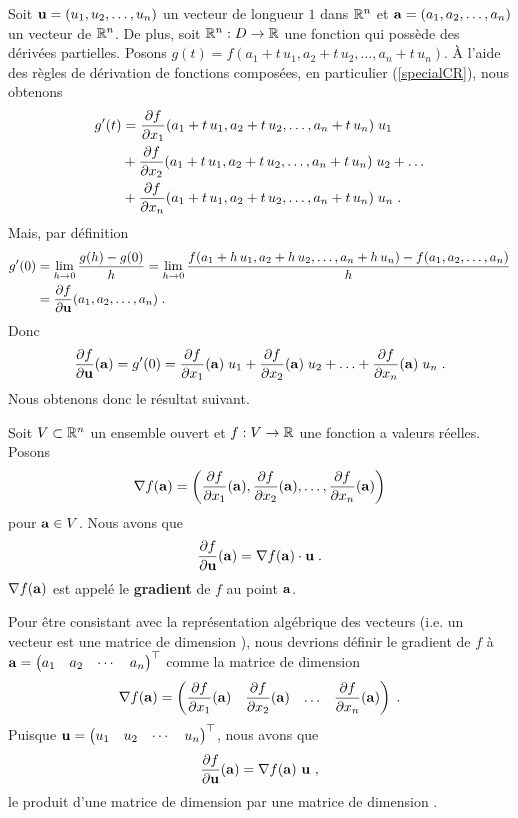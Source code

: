 {Soit $\mathbf{u} = (u_1,u_2, \ldots, u_n)$ un vecteur de longueur $1$ dans
$\mathbb{R}^n$ et $\mathbf{a}=(a_1,a_2,\ldots,a_n)$ un vecteur de $\mathbb{R}^n$. De plus,
soit $\mathbb{R}^n:D\rightarrow \mathbb{R}$ une fonction qui possède des dérivées
partielles.
Posons $g(t) = f(a_1+t\,u_1,a_2+t\,u_2, \ldots, a_n + t\, u_n)$. 
À l'aide des règles de dérivation de fonctions composées, en
particulier (\ref{specialCR}), nous obtenons
\begin{align*}
g'(t) &= \frac{\partial f}{\partial x_1}(a_1+t\,u_1,a_2+t\,u_2, \ldots, a_n + t\,u_n)\;u_1 \\
&+ \frac{\partial f}{\partial x_2}(a_1+t\,u_1,a_2+t\,u_2, \ldots, a_n + t\,u_n)\;u_2 + \ldots \\
&+ \frac{\partial f}{\partial x_n}(a_1+t\,u_1,a_2+t\,u_2, \ldots, a_n + t\,u_n)\;u_n \; .
\end{align*}
Mais, par définition
\begin{align*}
g'(0) &= \lim_{h\rightarrow 0} \frac{g(h)-g(0)}{h}
= \lim_{h\rightarrow 0}
\frac{f(a_1+h\,u_1,a_2+h\,u_2, \ldots, a_n + h\, u_n)
- f(a_1,a_2, \ldots, a_n)}{h} \\
&= \frac{\partial f}{\partial \mathbf{u}}(a_1,a_2, \ldots, a_n) \; .
\end{align*}
Donc
\[
\frac{\partial f}{\partial \mathbf{u}}(\mathbf{a}) = g'(0)
= \frac{\partial f}{\partial x_1}(\mathbf{a})\;u_1 +
\frac{\partial f}{\partial x_2}(\mathbf{a})\;u_2 +
\ldots + \frac{\partial f}{\partial x_n}(\mathbf{a})\;u_n \; .
\]
Nous obtenons donc le résultat suivant.

\begin{focus}{\prp} 
Soit $V\subset \mathbb{R}^n$ un ensemble ouvert et $f:V\rightarrow \mathbb{R}$ une
fonction a valeurs réelles.  Posons
\begin{equation}\label{gradient}
\nabla f(\mathbf{a}) = \left(\frac{\partial f}{\partial x_1}(\mathbf{a}),
\frac{\partial f}{\partial x_2}(\mathbf{a}), \ldots, \frac{\partial f}{\partial x_n}(\mathbf{a}) \right)
\end{equation}
pour $\mathbf{a} \in V$.  Nous avons que
\begin{equation}\label{dirderGrad}
\frac{\partial f}{\partial \mathbf{u}}(\mathbf{a}) =
\nabla f(\mathbf{a}) \cdot \mathbf{u} \; .
\end{equation}
$\nabla f(\mathbf{a})$ est appelé le {\bfseries gradient} de $f$ au point
$\mathbf{a}$.
\end{focus}

\begin{rmk}
Pour être consistant avec la représentation algébrique des vecteurs (i.e. un
vecteur est une matrice de dimension ), nous devrions définir le
gradient de $f$ à $\displaystyle \mathbf{a} = \begin{pmatrix}
a_1 & a_2 & \cdots & a_n \end{pmatrix}^\top$ comme la matrice de dimension
\[
\nabla f(\mathbf{a}) =
\begin{pmatrix}\displaystyle \frac{\partial f}{\partial x_1}(\mathbf{a}) &
\displaystyle \frac{\partial f}{\partial x_2}(\mathbf{a}) & \ldots &
\displaystyle \frac{\partial f}{\partial x_n}(\mathbf{a}) \end{pmatrix} \; .
\]
Puisque $\displaystyle \mathbf{u} = \begin{pmatrix} u_1 & u_2 & \cdots &
u_n \end{pmatrix}^\top$, nous avons que
\[
\frac{\partial f}{\partial \mathbf{u}}(\mathbf{a}) =
\nabla f(\mathbf{a})\ \mathbf{u} \ ,
\]
le produit d'une matrice de dimension  par une matrice de
dimension .


\end{rmk}}
